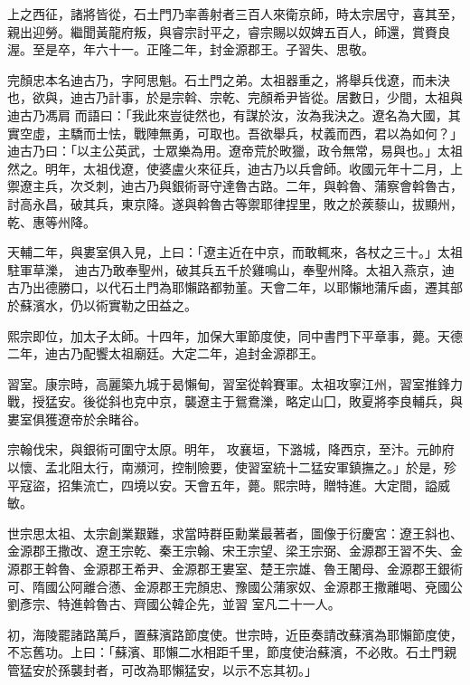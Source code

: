 \begin{pinyinscope}
 上之西征，諸將皆從，石土門乃率善射者三百人來衛京師，時太宗居守，喜其至，親出迎勞。繼聞黃龍府叛，與睿宗討平之，睿宗賜以奴婢五百人，師還，賞賚良渥。至是卒，年六十一。正隆二年，封金源郡王。子習失、思敬。



 完顏忠本名迪古乃，字阿思魁。石土門之弟。太祖器重之，將舉兵伐遼，而未決也，欲與，迪古乃計事，於是宗斡、宗乾、完顏希尹皆從。居數日，少間，太祖與迪古乃馮肩
 而語曰：「我此來豈徒然也，有謀於汝，汝為我決之。遼名為大國，其實空虛，主驕而士怯，戰陣無勇，可取也。吾欲舉兵，杖義而西，君以為如何？」迪古乃曰：「以主公英武，士眾樂為用。遼帝荒於畋獵，政令無常，易與也。」太祖然之。明年，太祖伐遼，使婆盧火來征兵，迪古乃以兵會師。收國元年十二月，上禦遼主兵，次爻刺，迪古乃與銀術哥守達魯古路。二年，與斡魯、蒲察會斡魯古，討高永昌，破其兵，東京降。遂與斡魯古等禦耶律捏里，敗之於蒺藜山，拔顯州，乾、惠等州降。



 天輔二年，與婁室俱入見，上曰：「遼主近在中京，而敢輒來，各杖之三十。」太祖駐軍草濼，
 迪古乃敢奉聖州，破其兵五千於雞鳴山，奉聖州降。太祖入燕京，迪古乃出德勝口，以代石土門為耶懶路都勃堇。天會二年，以耶懶地蒲斥鹵，遷其部於蘇濱水，仍以術實勒之田益之。



 熙宗即位，加太子太師。十四年，加保大軍節度使，同中書門下平章事，薨。天德二年，迪古乃配饗太祖廟廷。大定二年，追封金源郡王。



 習室。康宗時，高麗築九城于曷懶甸，習室從斡賽軍。太祖攻寧江州，習室推鋒力戰，授猛安。後從斜也克中京，襲遼主于鴛鴦濼，略定山囗，敗夏將李良輔兵，與婁室俱獲遼帝於余睹谷。



 宗翰伐宋，與銀術可圍守太原。明年，
 攻襄垣，下潞城，降西京，至汴。元帥府以懷、孟北阻太行，南瀕河，控制險要，使習室統十二猛安軍鎮撫之。」於是，殄平寇盜，招集流亡，四境以安。天會五年，薨。熙宗時，贈特進。大定間，謚威敏。



 世宗思太祖、太宗創業艱難，求當時群臣勳業最著者，圖像于衍慶宮：遼王斜也、金源郡王撒改、遼王宗乾、秦王宗翰、宋王宗望、梁王宗弼、金源郡王習不失、金源郡王斡魯、金源郡王希尹、金源郡王婁室、楚王宗雄、魯王闍母、金源郡王銀術可、隋國公阿離合懣、金源郡王完顏忠、豫國公蒲家奴、金源郡王撒離喝、兗國公劉彥宗、特進斡魯古、齊國公韓企先，並習
 室凡二十一人。



 初，海陵罷諸路萬戶，置蘇濱路節度使。世宗時，近臣奏請改蘇濱為耶懶節度使，不忘舊功。上曰：「蘇濱、耶懶二水相距千里，節度使治蘇濱，不必敗。石土門親管猛安於孫襲封者，可改為耶懶猛安，以示不忘其初。」




\end{pinyinscope}
